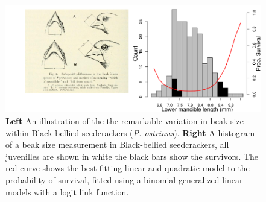 \begin{figure}
\begin{center}
\includegraphics[width= \textwidth]{Journal_figs/Quant_gen/Smith_black_bellied_seed_cracker/Smith_black_bellied.pdf}
\end{center}
\caption{ {\bf Left} An illustration of the the remarkable variation
  in beak size within Black-bellied seedcrackers ({\it  P.
    ostrinus}). {\bf Right} A histogram of a beak size measurement in
  Black-bellied seedcrackers, all juvenilles are shown in white the
  black bars show the survivors. The red curve shows the best fitting
  linear and quadratic model to the probability of survival, fitted
  using a binomial generalized linear models with a logit link function.  
     } \label{Black_bellied_seedcrackers_beaks}
\end{figure}



